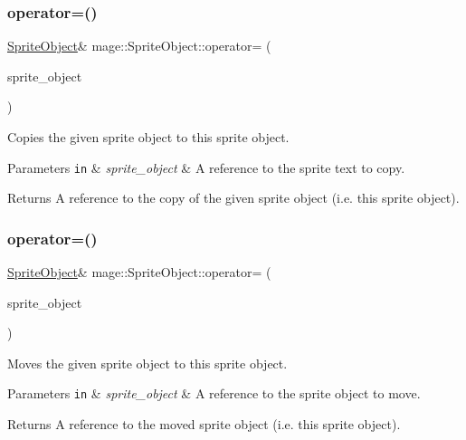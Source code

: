\subsubsection{\texorpdfstring{operator=()}{operator=()}\hspace{0.1cm}{\footnotesize\ttfamily [1/2]}}
{\footnotesize\ttfamily \hyperlink{classmage_1_1_sprite_object}{Sprite\+Object}\& mage\+::\+Sprite\+Object\+::operator= (\begin{DoxyParamCaption}\item[{const \hyperlink{classmage_1_1_sprite_object}{Sprite\+Object} \&}]{sprite\+\_\+object }\end{DoxyParamCaption})\hspace{0.3cm}{\ttfamily [delete]}}

Copies the given sprite object to this sprite object.


\begin{DoxyParams}[1]{Parameters}
\mbox{\tt in}  & {\em sprite\+\_\+object} & A reference to the sprite text to copy. \\
\hline
\end{DoxyParams}
\begin{DoxyReturn}{Returns}
A reference to the copy of the given sprite object (i.\+e. this sprite object). 
\end{DoxyReturn}
\hypertarget{classmage_1_1_sprite_object_a0d098954e6ef5b331b2b7e6f6cb3c21e}{}\label{classmage_1_1_sprite_object_a0d098954e6ef5b331b2b7e6f6cb3c21e} 
\subsubsection{\texorpdfstring{operator=()}{operator=()}\hspace{0.1cm}{\footnotesize\ttfamily [2/2]}}
{\footnotesize\ttfamily \hyperlink{classmage_1_1_sprite_object}{Sprite\+Object}\& mage\+::\+Sprite\+Object\+::operator= (\begin{DoxyParamCaption}\item[{\hyperlink{classmage_1_1_sprite_object}{Sprite\+Object} \&\&}]{sprite\+\_\+object }\end{DoxyParamCaption})\hspace{0.3cm}{\ttfamily [delete]}}

Moves the given sprite object to this sprite object.


\begin{DoxyParams}[1]{Parameters}
\mbox{\tt in}  & {\em sprite\+\_\+object} & A reference to the sprite object to move. \\
\hline
\end{DoxyParams}
\begin{DoxyReturn}{Returns}
A reference to the moved sprite object (i.\+e. this sprite object). 
\end{DoxyReturn}
\hypertarget{classmage_1_1_sprite_object_ad42b0aa80333e21df4855a36d738ba97}{}\label{classmage_1_1_sprite_object_ad42b0aa80333e21df4855a36d738ba97} 
